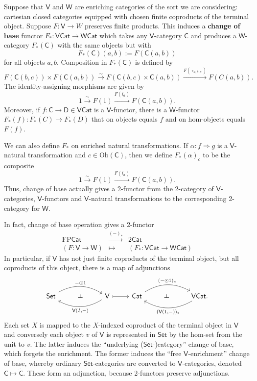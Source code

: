 \documentclass{amsart}
\theoremstyle{definition}
\def\ld{\rotatebox[origin=c]{-90}{$\dashv$}} %
\newcommand{\Set}{\mathsf{Set}}
\newcommand{\Cat}{\mathsf{Cat}}
\newcommand{\V}{\mathsf{V}}
\newcommand{\W}{\mathsf{W}}
\newcommand{\D}{\mathsf{D}}
\newcommand{\C}{\mathsf{C}}
\newcommand{\FP}{\mathrm{FP}}
\newcommand{\Obj}{\mathrm{Ob}}
\newcommand{\maps}{\colon}
\begin{document}
Suppose that $\V$ and $\W$ are enriching categories of the sort we are considering: 
cartesian closed categories equipped with chosen finite coproducts of the terminal object.
Suppose $F \maps \V \to W$ preserves finite products.   This induces a \textbf{change of base} functor $F_*\maps\V\Cat \to \W\Cat$ \cite{borceux} which takes any $\V$-category $\C$ and produces a $\W$-category $F_*(\C)$ with the same objects but with
\[      F_*(\C)(a,b) := F(\C(a,b)) \]
for all objects $a,b$.   Composition in $F_*(\C)$ is defined by
\[       F(\C(b,c)) \times F(\C(a,b)) \stackrel{\sim}{\longrightarrow} F(\C(b,c) \times \C(a,b)) 
\stackrel{F(\circ_{a,b,c})}{\longrightarrow} F(C(a,b)) . \]  
The identity-assigning morphisms are given by
\[          1 \stackrel{\sim}{\longrightarrow} F(1) \stackrel{F(i_a)}{\longrightarrow}
F(\C(a,b)) .\]
Moreover, if $f\maps \C \to \D \in \V\Cat$ is a $\V$-functor, there is a $\W$-functor $F_*(f) \maps F_*(C) \to F_*(D)$ that on objects equals $f$ and on hom-objects equals $F(f)$.   

We can also define $F_*$ on enriched natural transformations.   If $\alpha\maps f \Rightarrow g$ is a $\V$-natural transformation and $c\in \Obj(\C)$, then we define $F_*(\alpha)_c$ to be the composite
\[      1 \stackrel{\sim}{\longrightarrow} F(1) \stackrel{F(i_a)}{\longrightarrow}
F(\C(a,b)) .\]   
Thus, change of base actually gives a 2-functor from the 2-category of $\V$-categories, 
$\V$-functors and $\V$-natural transformations to the corresponding 2-category for $\W$.

\iffalse
In fact, change of base operation gives a 2-functor
\[\begin{array}{ccc}
\FP\Cat & \xrightarrow{(-)_*} & 2\Cat\\
(F\maps \V\to\W) & \mapsto & (F_*\maps \V\Cat\to\W\Cat)
\end{array}\]
In particular, if $\V$ has not just finite coproducts of the terminal object, but all 
coproducts of this object, there is a map of adjunctions
\[\begin{tikzcd}
	\Set \arrow[bend left,below]{rr}{-\odot 1}
	& \ld &
	\arrow[bend left,above]{ll}{\V(I,-)} \V
	\arrow[maps to]{r}
	& \Cat \arrow[bend left,below]{rr}{(-\odot 1)_*}
	& \ld &
	\arrow[bend left,above]{ll}{(\V(1,-))_*} \V\Cat.
\end{tikzcd}\]
Each set $X$ is mapped to the $X$-indexed coproduct of the terminal object in $\V$ and conversely each object $v$ of $\V$ is represented in $\Set$ by the hom-set from the unit to $v$. The latter induces the ``underlying ($\Set$-)category'' change of base, which forgets the enrichment. The former induces the ``free $\V$-enrichment'' change of base, whereby ordinary $\Set$-categories are converted to $\V$-categories, denoted $\C \mapsto \tilde{\C}$. These form an adjunction, because 2-functors preserve adjunctions.
\end{document}
